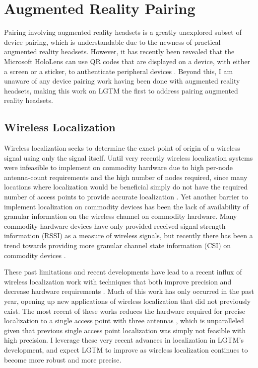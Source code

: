 \documentclass[12pt]{report}
\begin{document}
\section{Augmented Reality Pairing}
Pairing involving augmented reality headsets is a greatly unexplored subset of device pairing, which is understandable due to the newness of practical augmented reality headsets. However, it has recently been revealed that the Microsoft HoloLens can use QR codes that are displayed on a device, with either a screen or a sticker, to authenticate peripheral devices \cite{HoloLensVisualPairing2016}. Beyond this, I am unaware of any device pairing work having been done with augmented reality headsets, making this work on LGTM the first to address pairing augmented reality headsets. \par

\subsection{Wireless Localization}
Wireless localization seeks to determine the exact point of origin of a wireless signal using only the signal itself. Until very recently wireless localization systems were infeasible to implement on commodity hardware due to high per-node antenna-count requirements \cite{ArrayTrackXiong2013} and the high number of nodes required, since many locations where localization would be beneficial simply do not have the required number of access points to provide accurate localization \cite{PinPointJoshi2013,PhaserGjengset2014,ArrayTrackXiong2013}. Yet another barrier to implement localization on commodity devices has been the lack of availability of granular information on the wireless channel on commodity hardware. Many commodity hardware devices have only provided received signal strength information (RSSI) as a measure of wireless signals, but recently there has been a trend towards providing more granular channel state information (CSI) on commodity devices \cite{ChannelStateInformationToolReleaseHalperin2011,RSSIToCSIZheng2013}. \par

These past limitations and recent developments have lead to a recent influx of wireless localization work with techniques that both improve precision and decrease hardware requirements \cite{UbicarseKumar2014,SpotFiKotaru2015,ChronosSingleAPLocalizationVasisht2016,PhaserGjengset2014}. Much of this work has only occurred in the past year, opening up new applications of wireless localization that did not previously exist. The most recent of these works reduces the hardware required for precise localization to a single access point with three antennas \cite{ChronosSingleAPLocalizationVasisht2016}, which is unparalleled given that previous single access point localization was simply not feasible with high precision. I leverage these very recent advances in localization in LGTM's development, and expect LGTM to improve as wireless localization continues to become more robust and more precise. \par
\end{document}
